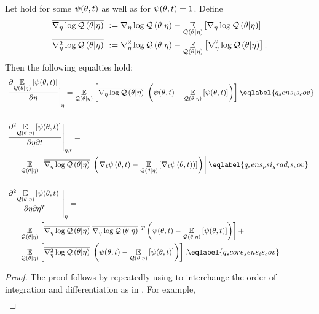 \begin{lem}
%
Let  hold for some $\psi(\theta, t)$ as well as
for $\psi(\theta, t) = 1$.  Define
%
\begin{align*}
%
\lqgradbar{\theta \vert \eta} :={}& \lqgrad{\theta \vert \eta}
  - \expect{\q(\theta \vert \eta)}{\lqgrad{\theta \vert \eta}} \\
\lqhessbar{\theta \vert \eta} :={}& \lqhess{\theta \vert \eta}
 - \expect{\q(\theta \vert \eta)}{\lqhess{\theta \vert \eta}}.
%
\end{align*}
%
Then the following equalties hold:
%
\begin{align}
%
\MoveEqLeft
\fracat{\partial \expect{\q(\theta \vert \eta)}
              {\psi(\theta, \t)}}{\partial \eta}{\eta} ={}
\expect{\q(\theta \vert \eta)}
       {\lqgradbar{\theta \vert \eta} \left(
        \psi(\theta,\t) - \expect{\q(\theta \vert \eta)}{\psi(\theta, \t)}
       \right)
       }\eqlabel{q_sens_is_cov}\\\nonumber\\
%
\MoveEqLeft
\fracat{\partial^2 \expect{\q(\theta \vert \eta)}
      {\psi(\theta, \t)}}{\partial \eta \partial \t}{\eta, \t} ={}\nonumber\\&
  \expect{\q(\theta \vert \eta)}
         {\lqgradbar{\theta \vert \eta} \left(
          \psigrad{\theta,\t} - \expect{\q(\theta \vert \eta)}{\psigrad{\theta, \t})}
         \right)
         } \eqlabel{q_sens_psi_grad_is_cov} \\\nonumber\\
 \MoveEqLeft
 \fracat{\partial^2 \expect{\q(\theta \vert \eta)}
       {\psi(\theta, \t)}}{\partial \eta \partial \eta^T}{\eta} ={}
 \nonumber\\&
 \expect{\q(\theta \vert \eta)}
        {\lqgradbar{\theta \vert \eta} \lqgradbar{\theta \vert \eta}^T
        \left(
         \psi(\theta,\t) - \expect{\q(\theta \vert \eta)}{\psi(\theta, \t)}
        \right)
        } +
 \nonumber\\ &
 \expect{\q(\theta \vert \eta)}{
        \lqhessbar{\theta \vert \eta}
        \left(
         \psi(\theta,\t) - \expect{\q(\theta \vert \eta)}{\psi(\theta, \t)}
        \right)
        }. \eqlabel{q_score_sens_is_cov}
%
\end{align}
%
\begin{proof}
%
The proof follows by repeatedly using  to interchange the order of
integration and differentiation as in \citep[Theorem
1]{giordano:2018:covariances}.  For example,
%
\begin{align*}

\end{align*}
\end{proof}
\end{lem}
